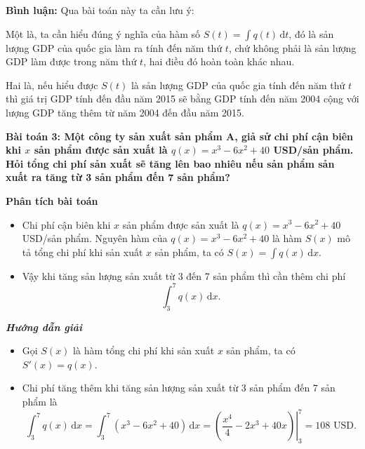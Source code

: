 \documentclass[12pt,a4paper]{article}
\newcommand{\dd}{\,\mathrm{d}}
\newcommand{\analysis}{\noindent\raisebox{0.15ex}{\rule{1.6ex}{1.6ex}}\hspace{4pt}\textbf{Phân tích bài toán}\par}
\newcommand{\solution}{\begin{center}\textbf{\textit{Hướng dẫn giải}}\end{center}\par}
\newcommand{\commenthead}{\textbf{Bình luận:} Qua bài toán này ta cần lưu ý:\par}
\begin{document}
\begin{commentbox}\commenthead
Một là, ta cần hiểu đúng ý nghĩa của hàm số $S(t)=\int q(t)\dd t$, đó là sản lượng GDP của quốc gia làm ra tính đến năm thứ $t$, chứ không phải là sản lượng GDP làm được trong năm thứ $t$, hai điều đó hoàn toàn khác nhau.

Hai là, nếu hiểu được $S(t)$ là sản lượng GDP của quốc gia tính đến năm thứ $t$ thì giá trị GDP tính đến đầu năm 2015 sẽ bằng GDP tính đến năm 2004 cộng với lượng GDP tăng thêm từ năm 2004 đến đầu năm 2015.

\end{commentbox}\textbf{Bài toán 3: Một công ty sản xuất sản phẩm A, giả sử chi phí cận biên khi $x$ sản phẩm được sản xuất là $q(x)=x^3-6x^2+40$ USD/sản phẩm. Hỏi tổng chi phí sản xuất sẽ tăng lên bao nhiêu nếu sản phẩm sản xuất ra tăng từ 3 sản phẩm đến 7 sản phẩm?}\par\medskip
\begin{analysisbox}
\analysis
\begin{itemize}
\item Chi phí cận biên khi $x$ sản phẩm được sản xuất là $q(x)=x^3-6x^2+40$ USD/sản phẩm. Nguyên hàm của $q(x)=x^3-6x^2+40$ là hàm $S(x)$ mô tả tổng chi phí khi sản xuất $x$ sản phẩm, ta có $S(x)=\int q(x)\dd x$.
\item Vậy khi tăng sản lượng sản xuất từ 3 đến 7 sản phẩm thì cần thêm chi phí
\[
\int_3^7q(x)\dd x.
\]
\end{itemize}
\end{analysisbox}

\solution
\begin{itemize}
\item Gọi $S(x)$ là hàm tổng chi phí khi sản xuất $x$ sản phẩm, ta có $S'(x)=q(x)$.
\item Chi phí tăng thêm khi tăng sản lượng sản xuất từ 3 sản phẩm đến 7 sản phẩm là
\[
\int_3^7q(x)\dd x
=\int_3^7(x^3-6x^2+40)\dd x
=\left.\left(\frac{x^4}{4}-2x^3+40x\right)\right|_3^7
=108\text{ USD}.
\]
\end{itemize}
\end{document}
